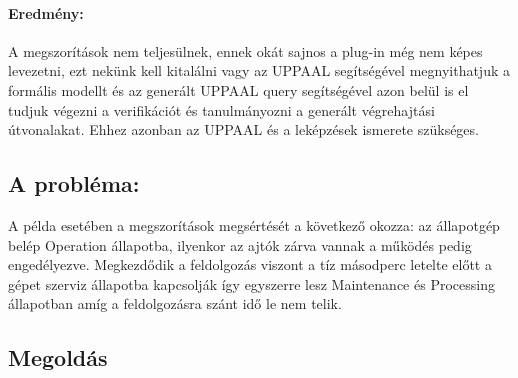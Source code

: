 \paragraph{Eredmény:} A megszorítások nem teljesülnek, ennek okát sajnos a plug-in még nem képes levezetni, ezt nekünk kell kitalálni vagy az UPPAAL segítségével megnyithatjuk a formális modellt és az generált UPPAAL query segítségével azon belül is el tudjuk végezni a verifikációt és tanulmányozni a generált végrehajtási útvonalakat. Ehhez azonban az UPPAAL és a leképzések ismerete szükséges.
\subsection{A probléma:} A példa esetében a megszorítások megsértését a következő okozza: az állapotgép belép Operation állapotba, ilyenkor az ajtók zárva vannak a működés pedig engedélyezve. Megkezdődik a feldolgozás viszont a tíz másodperc letelte előtt a gépet szerviz állapotba kapcsolják így egyszerre lesz Maintenance és Processing állapotban amíg a feldolgozásra szánt idő le nem telik.

\subsection{Megoldás}

